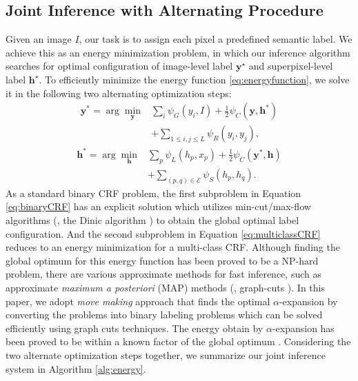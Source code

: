 \subsection{Joint Inference with Alternating Procedure}
\label{sec:inference}
Given an image $I$, our task is to assign each pixel a predefined semantic label. We achieve this as an energy minimization problem, in which our inference algorithm searches for optimal configuration of image-level label $\boldsymbol{y}^\star$ and superpixel-level label $\boldsymbol{h}^\star$. To efficiently minimize the energy function \eqref{eq:energyfunction}, we solve it in the following two alternating optimization steps:
\begin{equation}
    \label{eq:binaryCRF}
    \begin{aligned}
        \boldsymbol{y}^* = \arg\min_{\boldsymbol{y}} &\sum_{i} {\psi_{G}(y_i,I)} + \frac{1}{2} \psi_{C}(\boldsymbol{y},\boldsymbol{h}^*) \\ &+ \sum_{1 \le i,j \le L} {\psi_{R}(y_i,y_j)},
    \end{aligned}
\end{equation}
\begin{equation}
    \label{eq:multiclassCRF}
    \begin{aligned}
        \boldsymbol{h}^* = \arg\min_{\boldsymbol{h}} &\sum_{p} {\psi_{L}(h_p,x_p)} + \frac{1}{2} \psi_{C}(\boldsymbol{y}^*,\boldsymbol{h}) \\ &+ \sum_{(p,q) \in \mathcal{E}}{\psi_{S}(h_p,h_q)}.
    \end{aligned}
\end{equation}
As a standard binary CRF problem, the first subproblem in Equation \eqref{eq:binaryCRF} has an explicit solution which utilizes min-cut/max-flow algorithms (\eg, the Dinic algorithm \cite{dinits1970algorithm}) to obtain the global optimal label configuration. And the second subproblem in Equation \eqref{eq:multiclassCRF} reduces to an energy minimization for a multi-class CRF. Although finding the global optimum for this energy function has been proved to be a NP-hard problem, there are various approximate methods for fast inference, such as approximate \textit{maximum a posteriori} (MAP) methods (\eg, graph-cuts \cite{boykov2001fast}). In this paper, we adopt \textit{move making} approach \cite{boykov2001fast} that finds the optimal $\alpha$-expansion \cite{boykov2001fast,kolmogorov2004energy} by converting the problems into binary labeling  problems which can be solved efficiently using graph cuts techniques. The energy obtain by $\alpha$-expansion has been proved to be within a known factor of the global optimum \cite{boykov2001fast}. Considering the two alternate optimization steps together, we summarize our joint inference system in Algorithm \ref{alg:energy}.


